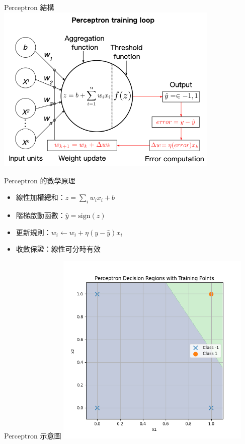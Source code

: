 \documentclass{beamer}
\begin{document}
\begin{frame}{Perceptron 結構}
  \centering
  \includegraphics[width=0.8\textwidth]{perceptron_pic.png}
\end{frame}

\begin{frame}{Perceptron 的數學原理}
  \begin{itemize}
    \item 線性加權總和：$z=\sum_i w_i x_i + b$
    \item 階梯啟動函數：$\hat y=\mathrm{sign}(z)$
    \item 更新規則：$w_i\leftarrow w_i+\eta(y-\hat y)x_i$
    \item 收斂保證：線性可分時有效
  \end{itemize}
\end{frame}

\begin{frame}{Perceptron 示意圖}
  \centering
  \includegraphics[width=0.7\textwidth]{Perceptron.png}
\end{frame}
\end{document}
